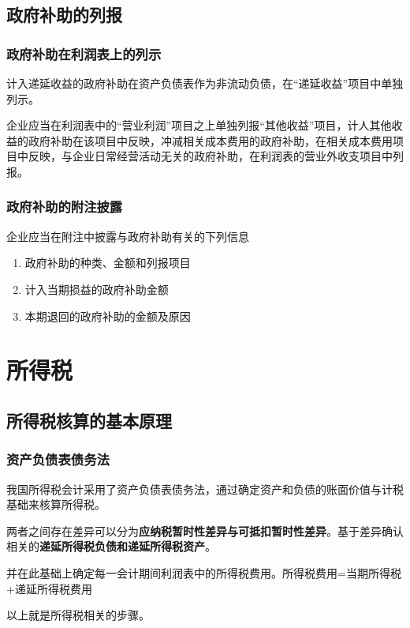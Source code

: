 \documentclass[UTF8,12pt]{ctexart}
\numberwithin{equation}{section} %
\numberwithin{figure}{section}
\numberwithin{table}{section}
\begin{document}
	\subsection{政府补助的列报}
	\subsubsection{政府补助在利润表上的列示}
	计入递延收益的政府补助在资产负债表作为非流动负债，在“递延收益”项目中单独列示。
	
	企业应当在利润表中的“营业利润”项目之上单独列报“其他收益”项目，计人其他收益的政府补助在该项目中反映，冲减相关成本费用的政府补助，在相关成本费用项目中反映，与企业日常经营活动无关的政府补助，在利润表的营业外收支项目中列报。
	
	\subsubsection{政府补助的附注披露}
	企业应当在附注中披露与政府补助有关的下列信息
	\begin{enumerate}
		\item 政府补助的种类、金额和列报项目
		
		\item 计入当期损益的政府补助金额
		
		\item 本期退回的政府补助的金额及原因
	\end{enumerate}
	
	\newpage
	\section{所得税}
	\subsection{所得税核算的基本原理}
	\subsubsection{资产负债表债务法}
	
	我国所得税会计采用了资产负债表债务法，通过确定资产和负债的账面价值与计税基础来核算所得税。
	
	两者之间存在差异可以分为\textbf{应纳税暂时性差异与可抵扣暂时性差异}。基于差异确认相关的\textbf{递延所得税负债和递延所得税资产}。
	
	并在此基础上确定每一会计期间利润表中的所得税费用。所得税费用=当期所得税+递延所得税费用
	
	以上就是所得税相关的步骤。
	
\end{document}
